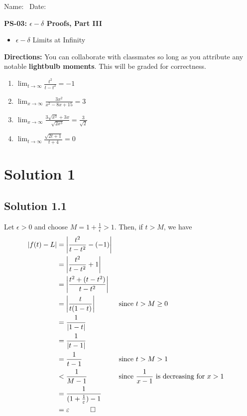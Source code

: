 \documentclass{article}
\begin{document}
\flushleft
Name:\ \makebox[3in]{\hrulefill} \hspace{1in} Date:\ \makebox[1in]{\hrulefill} 
\begin{center}
    \textbf{PS-03: $\epsilon-\delta$ Proofs, Part III}
\end{center}

\begin{center}
\begin{tcolorbox}[colback=white, colframe=black, colbacktitle=white, coltitle=black, title=\textbf{Topics},boxrule=1pt,width=12cm]
    \begin{itemize}
        \item $\epsilon-\delta$ Limits at Infinity
    \end{itemize}
\end{tcolorbox}
\end{center}

\textbf{Directions:}  You can collaborate with classmates so long as you attribute any notable \textbf{lightbulb moments}. This will be graded for correctness.
\begin{enumerate}
  \item $\lim_{t \to \infty} \frac{t^2}{t-t^2} = -1$
  \item $\lim_{x \to \infty} \frac{3x^2}{x^2-8x+15} = 3$
  \item $\lim_{x \to \infty} \frac{3\sqrt{x^3}+3x}{\sqrt{2x^3}} = \frac{3}{\sqrt{2}}$
  \item $\lim_{t \to \infty} \frac{\sqrt{2t+1}}{t+4} = 0$
\end{enumerate}

\section*{Solution 1}
\subsection*{Solution 1.1}
Let $\epsilon > 0$ and choose $M = 1+\frac{1}{\epsilon} > 1$. Then, if $t > M$, we have
\begin{align*}
    \left| f(t) - L \right|     
    &= \left| \frac{t^2}{t-t^2} - (-1) \right| \\
    &= \left| \frac{t^2}{t-t^2} + 1 \right| \\
    &= \left| \frac{t^2+(t-t^2)}{t-t^2} \right| \\
    &= \left| \frac{t}{t(1-t)} \right| && \text{since }t > M \geq 0 \\
    &= \frac{1}{\left|1-t\right|} \\
    &= \frac{1}{\left|t-1\right|} \\
    &= \frac{1}{t-1} && \text{since } t >M > 1 \\
    &< \frac{1}{M-1} && \text{since } \frac{1}{x-1} \text{ is decreasing for } x > 1 \\
    &= \frac{1}{(1+\frac{1}{\epsilon})-1} \\
    &= \epsilon \quad \qed
\end{align*}
\end{document}
